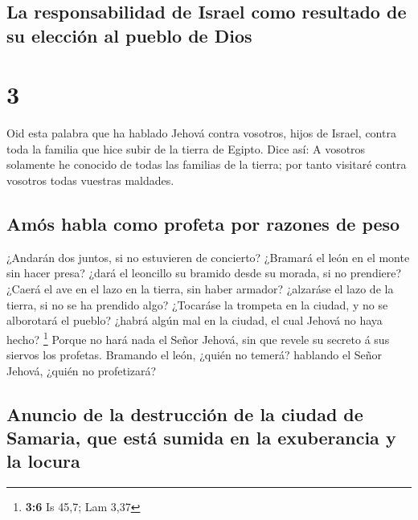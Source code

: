 \hypertarget{la-responsabilidad-de-israel-como-resultado-de-su-elecciuxf3n-al-pueblo-de-dios}{%
\subsection{La responsabilidad de Israel como resultado de su elección
al pueblo de
Dios}\label{la-responsabilidad-de-israel-como-resultado-de-su-elecciuxf3n-al-pueblo-de-dios}}

\hypertarget{section-2}{%
\section{3}\label{section-2}}

 Oid esta palabra que ha hablado Jehová contra vosotros,
hijos de Israel, contra toda la familia que hice subir de la tierra de
Egipto. Dice así:  A vosotros solamente he conocido de
todas las familias de la tierra; por tanto visitaré contra vosotros
todas vuestras maldades.

\hypertarget{amuxf3s-habla-como-profeta-por-razones-de-peso}{%
\subsection{Amós habla como profeta por razones de
peso}\label{amuxf3s-habla-como-profeta-por-razones-de-peso}}

 ¿Andarán dos juntos, si no estuvieren de concierto?
 ¿Bramará el león en el monte sin hacer presa? ¿dará el
leoncillo su bramido desde su morada, si no prendiere? 
¿Caerá el ave en el lazo en la tierra, sin haber armador? ¿alzaráse el
lazo de la tierra, si no se ha prendido algo?  ¿Tocaráse
la trompeta en la ciudad, y no se alborotará el pueblo? ¿habrá algún mal
en la ciudad, el cual Jehová no haya hecho? \footnote{\textbf{3:6} Is
  45,7; Lam 3,37}  Porque no hará nada el Señor Jehová,
sin que revele su secreto á sus siervos los profetas. 
Bramando el león, ¿quién no temerá? hablando el Señor Jehová, ¿quién no
profetizará?

\hypertarget{anuncio-de-la-destrucciuxf3n-de-la-ciudad-de-samaria-que-estuxe1-sumida-en-la-exuberancia-y-la-locura}{%
\subsection{Anuncio de la destrucción de la ciudad de Samaria, que está
sumida en la exuberancia y la
locura}\label{anuncio-de-la-destrucciuxf3n-de-la-ciudad-de-samaria-que-estuxe1-sumida-en-la-exuberancia-y-la-locura}}

